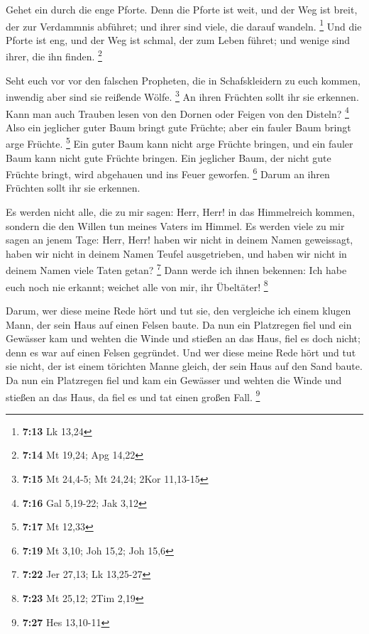 Gehet ein durch die enge Pforte. Denn die Pforte ist
weit, und der Weg ist breit, der zur Verdammnis abführet; und ihrer sind
viele, die darauf wandeln. \footnote{\textbf{7:13} Lk 13,24}
 Und die Pforte ist eng, und der Weg ist schmal, der zum
Leben führet; und wenige sind ihrer, die ihn finden. \footnote{\textbf{7:14}
  Mt 19,24; Apg 14,22}

 Seht euch vor vor den falschen Propheten, die in
Schafskleidern zu euch kommen, inwendig aber sind sie reißende Wölfe.
\footnote{\textbf{7:15} Mt 24,4-5; Mt 24,24; 2Kor 11,13-15}
 An ihren Früchten sollt ihr sie erkennen. Kann man auch
Trauben lesen von den Dornen oder Feigen von den Disteln? \footnote{\textbf{7:16}
  Gal 5,19-22; Jak 3,12}  Also ein jeglicher guter Baum
bringt gute Früchte; aber ein fauler Baum bringt arge Früchte.
\footnote{\textbf{7:17} Mt 12,33}  Ein guter Baum kann
nicht arge Früchte bringen, und ein fauler Baum kann nicht gute Früchte
bringen.  Ein jeglicher Baum, der nicht gute Früchte
bringt, wird abgehauen und ins Feuer geworfen. \footnote{\textbf{7:19}
  Mt 3,10; Joh 15,2; Joh 15,6}  Darum an ihren Früchten
sollt ihr sie erkennen.

 Es werden nicht alle, die zu mir sagen: Herr, Herr! in
das Himmelreich kommen, sondern die den Willen tun meines Vaters im
Himmel.  Es werden viele zu mir sagen an jenem Tage:
Herr, Herr! haben wir nicht in deinem Namen geweissagt, haben wir nicht
in deinem Namen Teufel ausgetrieben, und haben wir nicht in deinem Namen
viele Taten getan? \footnote{\textbf{7:22} Jer 27,13; Lk 13,25-27}
 Dann werde ich ihnen bekennen: Ich habe euch noch nie
erkannt; weichet alle von mir, ihr Übeltäter! \footnote{\textbf{7:23} Mt
  25,12; 2Tim 2,19}

 Darum, wer diese meine Rede hört und tut sie, den
vergleiche ich einem klugen Mann, der sein Haus auf einen Felsen baute.
 Da nun ein Platzregen fiel und ein Gewässer kam und
wehten die Winde und stießen an das Haus, fiel es doch nicht; denn es
war auf einen Felsen gegründet.  Und wer diese meine Rede
hört und tut sie nicht, der ist einem törichten Manne gleich, der sein
Haus auf den Sand baute.  Da nun ein Platzregen fiel und
kam ein Gewässer und wehten die Winde und stießen an das Haus, da fiel
es und tat einen großen Fall. \footnote{\textbf{7:27} Hes 13,10-11}

